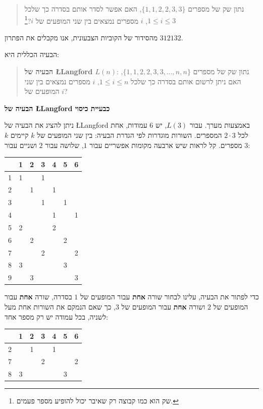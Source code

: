\documentclass[12pt,a4paper]{article}
\begin{document}
\begin{quote}
נתון שק של מספרים
$\{1,1,2,2,3,3\}$,
האם אפשר לסדר אותם בסדרה כך שלכל
$1\leq i \leq 3$,
$i$
מספרים נמצאים בין שני המופעים של
$i$?\footnote{
שק הוא כמו קבוצה רק שאיבר יכול להופיע מספר פעמים.}
\end{quote}
מהסידור של הקוביות הצבעונית, אנו מקבלים את הפתרון
$312132$.

הבעיה הכללית היא:
\begin{quote}
\textbf{
הבעיה של
\L{Langford} $L(n)$}:
נתון שק של מספרים
$\{1,1,2,2,3,3,\ldots,n,n\}$,
האם ניתן לרשום אותם בסדרה כך שלכל
$1\leq i \leq n$, $i$
מספרים נמצאים בין שני המופעים של
$i$?
\end{quote}

\begin{center}
\textbf{\Large
הבעיה של
\L{Langford}
כבעיית כיסוי}
\end{center}

ניתן להציג את הבעיה של
\L{Langford}
באמצעות מערך. עבור
$L(3)$,
יש
$6$
עמודות, אחת לכל 
$2\cdot 3$
המספרים. השורות מוגדרות לפי הגדרת הבעיה: בין שני המופעים של 
$k$
קיימים
$k$
מספרים. קל לראות שיש ארבעה מקומות אפשריים עבור
$1$,
שלושה עבור
$2$
ושניים עבור
$3$:

\begin{center}
\begin{tabular}{|c||c|c|c|c|c|c|}
\hline
&1&2&3&4&5&6\\\hline\hline
1&1&&1&&&\\\hline
2&&1&&1&&\\\hline
3&&&1&&1&\\\hline
4&&&&1&&1\\\hline
5&2&&&2&&\\\hline
6&&2&&&2&\\\hline
7&&&2&&&2\\\hline
8&3&&&&3&\\\hline
9&&3&&&&3\\\hline
\end{tabular}
\end{center}

כדי לפתור את הבעיה, עלינו לבחור שורה
\textbf{אחת}
עבור המופעים של
$1$
בסדרה, שורה
\textbf{אחת}
עבור המופעים של
$2$
ושורה
\textbf{אחת}
עבור המופעים של
$3$,
כך שאם הנמקם את השורות אחת מעל לשניה, בכל עמודה יש רק מספר אחד:

\begin{center}
\begin{tabular}{|c||c|c|c|c|c|c|}
\hline
&1&2&3&4&5&6\\\hline\hline
2&&1&&1&&\\\hline
7&&&2&&&2\\\hline
8&3&&&&3&\\\hline
\end{tabular}
\end{center}
\end{document}
